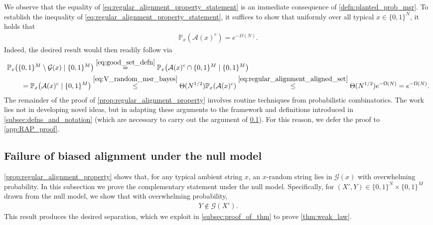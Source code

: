 \documentclass[11pt]{amsart}
\numberwithin{equation}{section}
\numberwithin{equation}{section}
\newcommand{\1}{\mathbbm{1}}
\newcommand{\Prob}{\mathbb{P}}
\theoremstyle{definition}
\begin{document}
We observe that the equality of \eqref{eq:regular_alignment_property_statement} is an immediate consequence of \cref{defn:planted_prob_msr}. To establish the inequality of \eqref{eq:regular_alignment_property_statement}, it suffices to show that uniformly over all typical $x \in \{0,1\}^{N}$, it holds that
\begin{align} \label{eq:regular_alignment_aligned_set}
    \Prob_x\!\left( \mathcal A(x)^c \right) = e^{-\Omega(N)}.
\end{align}
Indeed, the desired result would then readily follow via
\begin{align*}
    & \Prob_x\!\left( \{0,1\}^M \setminus \mathcal G(x) \mid \{0,1\}^M \right) \stackrel{\eqref{eq:good_set_defn}}{=} \Prob_x\!\left( \mathcal A(x)^c \cap \{0,1\}^M \mid \{0,1\}^M \right) \\
    & \qquad = \Prob_x\!\left( \mathcal A(x)^c \mid \{0,1\}^M \right) \stackrel{\eqref{eq:V_random_msr_bayes}}{\leq} \Theta( N^{1/2} ) \Prob_x\!\left( \mathcal A(x)^c \right) \stackrel{\eqref{eq:regular_alignment_aligned_set}}{\leq} \Theta( N^{1/2} ) e^{-\Omega(N)} = e^{-\Omega(N)}.
\end{align*}
The remainder of the proof of \cref{prop:regular_alignment_property} involves routine techniques from probabilistic combinatorics. The work lies not in developing novel ideas, but in adapting these arguments to the framework and definitions introduced in \cref{subsec:defns_and_notation} (which are necessary to carry out the argument of \cref{subsec:alignment_impossibility_ind_Y}). For this reason, we defer the proof to \cref{app:RAP_proof}.

\subsection{Failure of biased alignment under the null model} \label{subsec:alignment_impossibility_ind_Y}

\cref{prop:regular_alignment_property} shows that, for any typical ambient string $x$, an $x$-random string lies in $\mathcal G(x)$ with overwhelming probability. In this subsection we prove the complementary statement under the null model. Specifically, for $(X',Y) \in \{0,1\}^{N} \times \{0,1\}^M$ drawn from the null model, we show that with overwhelming probability,
\begin{align*}
    Y \notin \mathcal G(X').
\end{align*}
This result produces the desired separation, which we exploit in \cref{subsec:proof_of_thm} to prove \cref{thm:weak_law}. 
\end{document}
